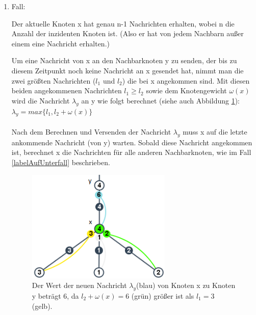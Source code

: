\begin{enumerate}
		
	
			
	\item Fall:
	
		
		Der aktuelle Knoten x hat genau n-1 Nachrichten erhalten, wobei n die Anzahl der inzidenten Knoten ist. (Also er hat von jedem Nachbarn außer einem eine Nachricht erhalten.)
		
	
		
		Um eine Nachricht von x an den Nachbarknoten y zu senden, der bis zu diesem Zeitpunkt noch keine Nachricht an x gesendet hat, nimmt man die zwei größten Nachrichten ($l_{1}$ und $l_{2}$) die bei x angekommen sind. Mit diesen beiden angekommenen Nachrichten $l_{1} \ge l_{2}$ sowie dem Knotengewicht $\omega(x)$ wird die Nachricht $\lambda_{y}$ an y wie folgt berechnet (siehe auch Abbildung \ref{abb_n-1}): $\lambda_{y} = max\{l_{1},  l_{2} + \omega(x)\}$
		\\
		\\	
		Nach dem Berechnen und Versenden der Nachricht $\lambda_{y}$ muss x auf die letzte ankommende Nachricht (von y) warten. Sobald diese Nachricht angekommen ist, berechnet x die Nachrichten für alle anderen Nachbarknoten, wie im Fall \ref{labelAufUnterfall} beschrieben. 
		
		
		\begin{figure}[htb]
			\includegraphics[width=0.65\textwidth]{bilder/abb_paper_n-1knoten.png}
			\captionsetup{width=0.65\textwidth}
			\caption{Der Wert der neuen Nachricht $\lambda_{y}$(blau) von Knoten x zu Knoten y beträgt 6, da $l_{2} + \omega(x) = 6$ (grün) größer ist als $l_{1} = 3$ (gelb).}
			\label{abb_n-1}
		\end{figure}
		

\end{enumerate}
